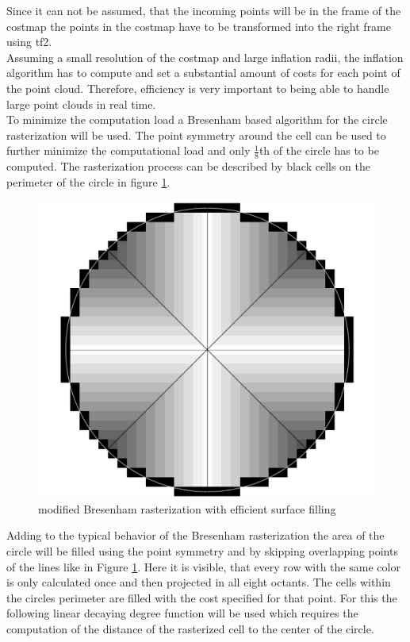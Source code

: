 Since it can not be assumed, that the incoming points will be in the frame of the costmap the points in the costmap have to be transformed into the right frame using tf2.\\

Assuming a small resolution of the costmap and large inflation radii, the inflation algorithm has to compute and set a substantial amount of costs for each point of the point cloud. Therefore, efficiency is very important to being able to handle large point clouds in real time.\\

To minimize the computation load a Bresenham based algorithm for the circle rasterization will be used\cite{ComputerGraphics}. The point symmetry around the cell can be used to further minimize the computational load and only $\frac{1}{8}$th of the circle has to be computed. The rasterization process can be described by black cells on the perimeter of the circle in figure \ref{rasterization}.\\

\begin{figure}
	\centering
	\includegraphics[width=.5\textwidth]{Pictures/rasterization}
	\caption{modified Bresenham rasterization with efficient surface filling}
	\label{rasterization}
\end{figure}


Adding to the typical behavior of the Bresenham rasterization the area of the circle will be filled using the point symmetry and by skipping overlapping points of the lines like in Figure \ref{rasterization}. Here it is visible, that every row with the same color is only calculated once and then projected in all eight octants. 
The cells within the circles perimeter are filled with the cost specified for that point. For this the following linear decaying  degree function will be used which requires the computation of the distance of the rasterized cell to the center of the circle.


